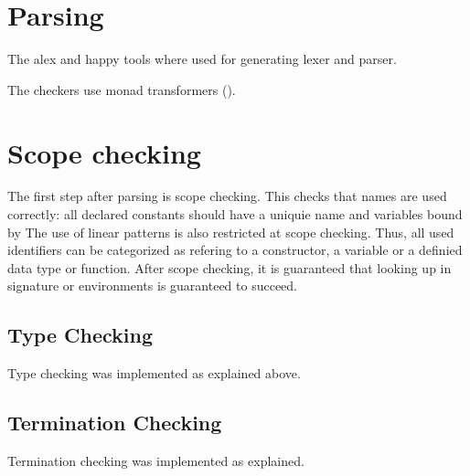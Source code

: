 \section{Parsing}
The alex \cite{alex} and happy \cite{happy} tools where used for generating lexer and parser.

The checkers use monad transformers (\cite{Grabmueller2006MonadTransformers}).

\section{Scope checking}
The first step after parsing is scope checking. This checks that names are used correctly:
all declared constants should have a uniquie name and variables bound by 
The use of linear patterns is also restricted at scope checking.
Thus, all used identifiers can be categorized as refering to a constructor, a variable or a definied data type or
function.
After scope checking, it is guaranteed that looking up in signature or environments is guaranteed to succeed.
\subsection{Type Checking}
Type checking was implemented as explained above.
\subsection{Termination Checking}
Termination checking was implemented as explained.


